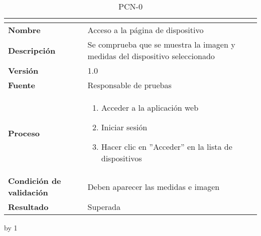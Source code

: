 \begin{table}[H]
	\caption{PCN-0\number\pcn}
	\begin{tabular}{|l|p{}|}
		\hline
		\multicolumn{2}{|c|}{\cellcolor[HTML]{BFBFBF}{\color[HTML]{000000} \textbf{PCN-0\number\pcn}}} \\ \hline
		\textbf{Nombre}                  & Acceso a la página de dispositivo                                            \\ \hline
		\textbf{Descripción}             & Se comprueba que se muestra la imagen y medidas del dispositivo seleccionado \\ \hline
		\textbf{Versión}                 & 1.0                                                                          \\ \hline
		\textbf{Fuente}                  & Responsable de pruebas                                                       \\ \hline
		\textbf{Proceso}                 & \begin{enumerate}
			\item Acceder a la aplicación web
			\item Iniciar sesión
			\item Hacer clic en ''Acceder'' en la lista de dispositivos
		\end{enumerate}                                                   \\ \hline
		\textbf{Condición de validación} & Deben aparecer las medidas e imagen                                          \\ \hline
		\textbf{Resultado}               & Superada                                                                     \\ \hline
	\end{tabular}
\end{table}
\advance\pcn by 1
